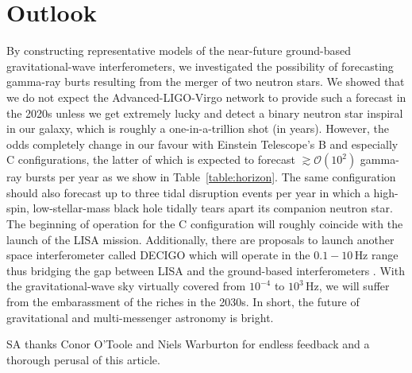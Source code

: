\documentclass[prd,amsmath,amssymb,aps,floats,amsfonts,notitlepage,superscriptaddress,eqsecnum,nofootinbib,10pt]{revtex4-1}
\newcommand{\ord}{\mathcal{O}}
\begin{document}
\section{Outlook}
By constructing representative models of the near-future ground-based gravitational-wave interferometers, we investigated the possibility of
forecasting gamma-ray burts resulting from the merger of two neutron stars.
We showed that we do not expect the Advanced-LIGO-Virgo network to provide such a forecast in the 2020s unless we get extremely lucky
and detect a binary neutron star inspiral in our galaxy, which is roughly a one-in-a-trillion shot (in years). %
However, the odds completely change in our favour with Einstein Telescope's B and especially C configurations, 
the latter of which is expected to forecast $\gtrsim \ord(10^2)$ gamma-ray bursts per year as we show in Table~\ref{table:horizon}. 
The same configuration should also forecast up to three tidal disruption events per year in which a high-spin, low-stellar-mass
black hole tidally tears apart its companion neutron star.
The beginning of operation for the C configuration will roughly coincide with the launch of the LISA mission.
Additionally, there are proposals to launch another space interferometer called DECIGO which will operate
in the $0.1 - 10\,$Hz range thus bridging the gap between LISA and the ground-based interferometers \cite{Sato:2009zzb, Kawamura:2006zz}.
With the gravitational-wave sky virtually covered from $10^{-4}$ to $10^3\,$Hz, we will suffer from the 
embarassment of the riches in the 2030s. In short, the future of gravitational and multi-messenger astronomy is bright.


\acknowledgements 
SA thanks Conor O'Toole and Niels Warburton for endless feedback and a thorough perusal of this article. 
 
 

%


 
 
 
 
 
 
 
\end{document}
